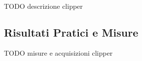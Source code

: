 
TODO descrizione clipper


\subsection*{Risultati Pratici e Misure}


TODO misure e acquisizioni clipper

